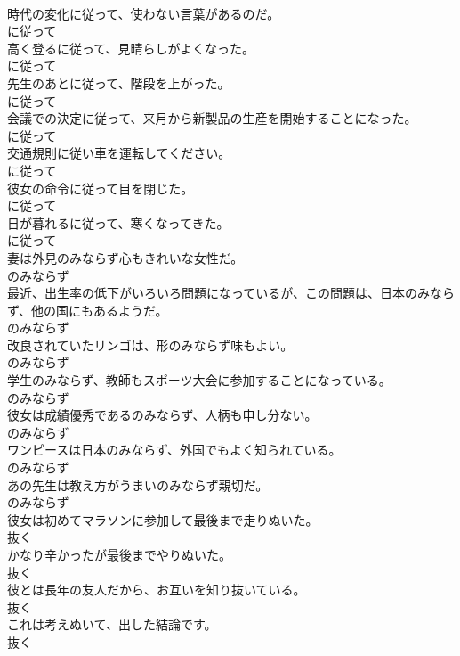 \documentclass[8pt]{extreport}
\begin{document}
\begin{CJK}{UTF8}{min}
\\	時代の変化に従って、使わない言葉があるのだ。	
\\	に従って	
\\	高く登るに従って、見晴らしがよくなった。	
\\	に従って	
\\	先生のあとに従って、階段を上がった。	
\\	に従って	
\\	会議での決定に従って、来月から新製品の生産を開始することになった。	
\\	に従って	
\\	交通規則に従い車を運転してください。	
\\	に従って	
\\	彼女の命令に従って目を閉じた。	
\\	に従って	
\\	日が暮れるに従って、寒くなってきた。	
\\	に従って	
\\	妻は外見のみならず心もきれいな女性だ。	
\\	のみならず	
\\	最近、出生率の低下がいろいろ問題になっているが、この問題は、日本のみならず、他の国にもあるようだ。	
\\	のみならず	
\\	改良されていたリンゴは、形のみならず味もよい。	
\\	のみならず	
\\	学生のみならず、教師もスポーツ大会に参加することになっている。	
\\	のみならず	
\\	彼女は成績優秀であるのみならず、人柄も申し分ない。	
\\	のみならず	
\\	ワンピースは日本のみならず、外国でもよく知られている。	
\\	のみならず	
\\	あの先生は教え方がうまいのみならず親切だ。	
\\	のみならず	
\\	彼女は初めてマラソンに参加して最後まで走りぬいた。	
\\	抜く	
\\	かなり辛かったが最後までやりぬいた。	
\\	抜く	
\\	彼とは長年の友人だから、お互いを知り抜いている。	
\\	抜く	
\\	これは考えぬいて、出した結論です。	
\\	抜く	

\end{CJK}
\end{document}
